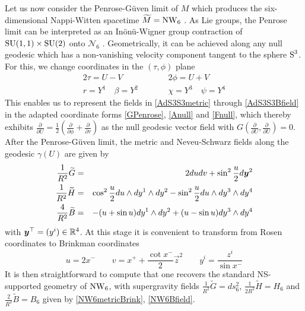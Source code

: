 Let us now consider the Penrose-G\"uven limit of $M$ which produces the
six-dimen\-sional Nappi-Witten spacetime $\widetilde{M}=\NW_6$ \cite{BFP1}. As
Lie groups, the Penrose limit can be interpreted as an In\"on\"u-Wigner group
contraction of ${\rm SU}(1,1)\times{\rm SU}(2)$ onto $\mathcal{N}_6$ \cite{SF1}.
Geometrically, it can be achieved along any null geodesic which has a
non-vanishing velocity component tangent to the sphere $\S^3$. For this, we
change coordinates in the $(\tau,\phi)$ plane
\begin{eqnarray}
  \label{UVAdS3S3def}
  2\tau=U-V &\qquad& 2\phi=U+V \\ \nonumber
  r=Y^1\quad\beta=Y^2 &\qquad& \chi=Y^3\quad\psi=Y^4
\end{eqnarray}
This enables us to represent the fields in \eqref{AdS3S3metric} through
\eqref{AdS3S3Bfield} in the adapted coordinate forms \eqref{GPenrose},
\eqref{Anull} and \eqref{Fnull}, which thereby exhibits $\frac\partial{\partial
  U}=\frac12(\frac\partial{\partial\phi}+\frac\partial{\partial\tau})$ as the
null geodesic vector field with $G(\frac\partial{\partial
  U},\frac\partial{\partial U})=0$. After the Penrose-G\"uven limit, the metric
and Neveu-Schwarz fields along the geodesic $\gamma(U)$ are given by
\begin{eqnarray}
  \label{NW6tildemetric}
  \frac1{R^2}\widetilde{G}&=&2 dudv+\sin^2\frac u2d{\mbf y}^2\\
  \label{NW6tildeflux}
  \frac1{R^2}\widetilde{H}&=&\cos^2\frac u2du
  \wedge dy^1\wedge dy^2-\sin^2\frac u2du\wedge dy^3\wedge d y^4\\
  \label{NW6tildeBfield}
  \frac4{R^2}\widetilde{B}&=&-(u+\sin u)
  dy^1\wedge dy^2+(u-\sin u)dy^3\wedge dy^4
\end{eqnarray}
with ${\mbf y}^\top=(y^i)\in\R^4$. At this stage it is convenient to transform
from Rosen coordinates to Brinkman coordinates
\begin{equation}
  \label{eq:ex:jose:brinkman}
  u=2x^- \qquad v=x^+ + \frac{\cot{x^-}}{2}\vec{z}^2 \qquad
  y^i=\frac{z^i}{\sin{x^-}}
\end{equation}
It is then straightforward to compute that one recovers the standard
NS-supported geometry of $\NW_6$, with supergravity fields
$\frac1{R^2}\widetilde{G}= d s_6^2$, $\frac1{2R^2}\widetilde{H}=H_6$ and
$\frac2{R^2}\widetilde{B}=B_6$ given by \eqref{NW6metricBrink},
\eqref{NW6Bfield}.

